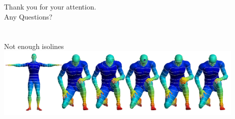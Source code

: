 \documentclass[]{beamer}
\begin{document}
\section*{}
	\begin{frame}
		\centering \large
		Thank you for your attention.\\
		Any Questions?
	\end{frame}

\section*{} %
\appendix
	\begin{frame}{Not enough isolines}
		\includegraphics[width=0.9\textwidth]{results/diffusion_small_isolines.png}\\
	\end{frame}
\end{document}
